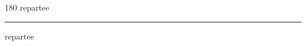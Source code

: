 
\begin{frame}
\begin{center}
\begin{turn}{180}
{\fontsize{2.5cm}{1em}\selectfont repartee}
\end{turn}
\vspace{1em}\par  
\hrule
\vspace{1em}\par  
{\fontsize{2.5cm}{1em}\selectfont repartee}
\end{center}
\end{frame}
